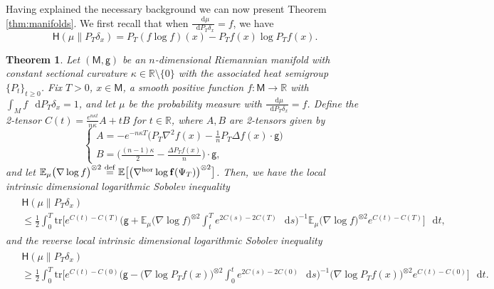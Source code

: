 \documentclass[a4paper,twoside,11pt,reqno]{amsart}
\newcommand{\eqdef}{\stackrel{\mathrm{def}}{=}}
\newtheorem{theorem}{Theorem}
\newcommand*\diff{\mathop{}\!\mathrm{d}}
\newcommand{\R}{\mathbb{R}} %
\newcommand{\li}{\bf }
\newcommand{\MM}{\mathsf{M}}
\newcommand{\GG}{\mathsf{g}}
\newcommand{\mb}{\mathbb}
\newcommand{\mr}{\mathrm}
\newcommand{\HH}{\mathsf{H}}
\begin{document}
Having explained the necessary background we can now present  Theorem \ref{thm:manifolds}. We first recall that when $\frac{\diff\mu}{\diff P_T\delta_x}=f$, we have
\begin{equation*}
\HH(\mu \| P_T\delta_x) =P_T(f\log f)(x)-P_Tf(x)\log P_Tf(x).
\end{equation*}
\begin{theorem} \label{thm:manifolds_sec}
Let $(\MM,\GG)$ be an $n$-dimensional Riemannian manifold with constant sectional curvature $\kappa\in\R\setminus\{0\}$ with the associated  heat semigroup $\{P_t\}_{t\ge 0}$. Fix $T>0$, $x\in\MM$, a smooth positive function $f:\MM\to\R$ with $\int_M f\,\diff P_T\delta_x=1$, and let $\mu$ be the probability measure with $\frac{\diff\mu}{\diff P_T\delta_x}=f$. Define the 2-tensor $C(t) = \frac{e^{n\kappa t}}{n\kappa}A+tB$ for $t\in\R$, where  $A, B$ are 2-tensors given by
\begin{equation}
\begin{cases}
A =- e^{-n\kappa T}  \big(P_T\nabla^2 f(x) - \frac{1}{n} P_T \Delta f(x)\cdot \GG\big) \\ B = \Big(\frac{(n-1)\kappa}{2} - \frac{\Delta P_T f(x)}{n}\Big) \cdot \GG,
\end{cases}
\end{equation}
and let $\mb{E}_\mu \big(\nabla \log  f\big)^{\otimes 2}\eqdef  \mb{E}\big[ \big( \nabla^{\mr{hor}} \log {\li f}(\Psi_T)\big)^{\otimes 2}\big] $.  Then, we have the local intrinsic dimensional logarithmic Sobolev inequality
\begin{align} \label{eq:manifolds-lsi_sec}
\begin{split}
&\HH(\mu \| P_T\delta_x)\\
& \leq \frac{1}{2} \int_0^T\!\!\!  \mr{tr}\Big[e^{C(t)-C(T)} \Big(\GG + \mb{E}_\mu \big(\nabla \log f\big)^{\otimes 2}\!\! \int_t^T e^{2C(s)-2C(T)} \,\diff s \Big)^{-1}\!\! \mb{E}_\mu \big(\nabla \log f\big)^{\otimes 2}  e^{C(t)-C(T)}\Big]\,\diff t,
\end{split}
\end{align}
and the reverse local intrinsic dimensional logarithmic Sobolev inequality
\begin{align} \label{eq:manifolds-rev-lsi_sec}
\begin{split}
&\HH(\mu \| P_T\delta_x)\\
& \geq \frac{1}{2} \int_0^T \mr{tr}\Big[e^{C(t)-C(0)} \Big( \GG -\big( \nabla \log P_Tf(x)\big)^{\otimes 2} \int_0^t e^{2C(s)-2C(0)}\,\diff s\Big)^{-1} \big( \nabla \log P_Tf(x)\big)^{\otimes 2} e^{C(t)-C(0)}\Big] \,\diff t.
\end{split}
\end{align}
\end{theorem}
\end{document}
